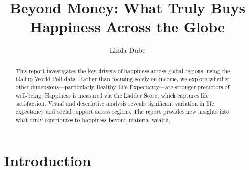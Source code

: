 \documentclass[11pt,preprint]{elsarticle}
\numberwithin{equation}{section}
\numberwithin{figure}{section}
\numberwithin{table}{section}
\begin{document}
\begin{frontmatter}  %

\title{Beyond Money: What Truly Buys Happiness Across the Globe}





\author[Add1]{Linda Dube}





\address[Add1]{Stellenbosch Wniversity, Western Cape}


\begin{abstract}
\small{
This report investigates the key drivers of happiness across global
regions, using the Gallup World Poll data. Rather than focusing solely
on income, we explore whether other dimensions---particularly Healthy
Life Expectancy---are stronger predictors of well-being. Happiness is
measured via the Ladder Score, which captures life satisfaction. Visual
and descriptive analysis reveals significant variation in life
expectancy and social support across regions. The report provides new
insights into what truly contributes to happiness beyond material
wealth.
}
\end{abstract}

\vspace{1cm}





\vspace{0.5cm}

\end{frontmatter}

\setcounter{footnote}{0}



\pagestyle{fancy}
\chead{}
\rhead{}
\lfoot{}
\lhead{}
\cfoot{}


\headsep 35pt %




\section{\texorpdfstring{Introduction
\label{Introduction}}{Introduction }}\label{introduction}
\end{document}

